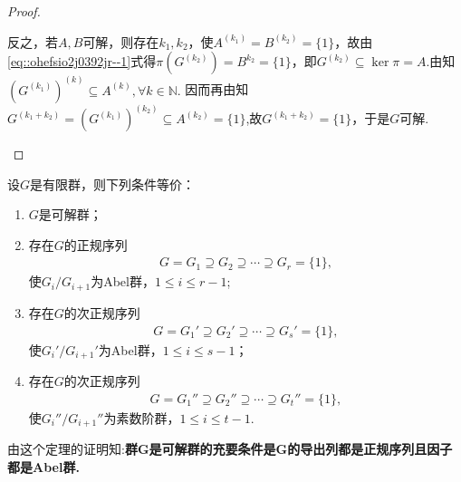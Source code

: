\documentclass[../../main.tex]{subfiles}%
\begin{document}
\begin{proof}
\begin{enumerate}[(1)]
反之，若$A, B$可解，则存在$k_1, k_2$，使$A^{(k_1)} = B^{(k_2)} = \{1\}$，故由\eqref{eq::ohefsio2j0392jr--1}式得$\pi(G^{(k_2)}) =B^{k_2}= \{1\}$，即$G^{(k_2)} \subseteq \ker \pi=A$.由知$(G^{(k_1)})^{(k)}\subseteq A^{(k)},\forall k\in \mathbb{N}.$
因而再由知$G^{(k_1 + k_2)}=(G^{(k_1)})^{(k_2)}\subseteq A^{(k_2)}=\{1\}$,故$G^{(k_1 + k_2)} = \{1\}$，于是$G$可解.
\end{enumerate}
\end{proof}

\begin{theorem}
设$G$是有限群，则下列条件等价：
\begin{enumerate}[(1)]
\item $G$是可解群；

\item 存在$G$的正规序列
\begin{align*}
G = G_1 \supseteq G_2 \supseteq \cdots \supseteq G_r = \{1\},
\end{align*}
使$G_i/G_{i+1}$为Abel群，$1 \leqslant i \leqslant r - 1$;

\item 存在$G$的次正规序列
\begin{align*}
G = G_1' \supseteq G_2' \supseteq \cdots \supseteq G_s' = \{1\},
\end{align*}
使$G_i'/G_{i+1}'$为Abel群，$1 \leqslant i \leqslant s - 1$；
\item 存在$G$的次正规序列
\begin{align*}
G = G_1'' \supseteq G_2'' \supseteq \cdots \supseteq G_t'' = \{1\},
\end{align*}
使$G_i''/G_{i+1}''$为素数阶群，$1 \leqslant i \leqslant t - 1$.
\end{enumerate}
\end{theorem}
\begin{remark}
由这个定理的证明知:\textbf{群G是可解群的充要条件是G的导出列都是正规序列且因子都是Abel群.}
\end{remark}
\end{document}
